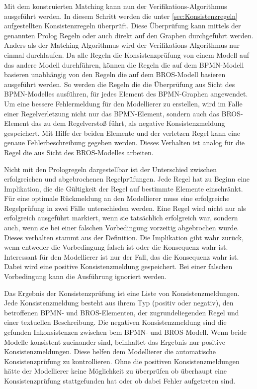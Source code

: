 Mit dem konstruierten Matching kann nun der Verifikations-Algorithmus ausgeführt werden.
In diesem Schritt werden die unter \cref{sec:Konsistenzregeln} aufgestellten Konsistenzregeln überprüft.
Diese Überprüfung kann mittels der genannten Prolog Regeln oder auch direkt auf den Graphen durchgeführt werden.
Anders als der Matching-Algorithmus wird der Verifikations-Algorithmus nur einmal durchlaufen.
Da alle Regeln die Konsistenzprüfung von einem Modell auf das andere Modell durchführen, können die Regeln die auf dem BPMN-Modell basieren unabhängig von den Regeln die auf dem BROS-Modell basieren ausgeführt werden.
So werden die Regeln die die Überprüfung aus Sicht des BPMN-Modelles ausführen, für jedes Element des BPMN-Graphen angewendet.
Um eine bessere Fehlermeldung für den Modellierer zu erstellen, wird im Falle einer Regelverletzung nicht nur das BPMN-Element, sondern auch das BROS-Element das zu dem Regelverstoß führt, als negative Konsistenzmeldung gespeichert.
Mit Hilfe der beiden Elemente und der verletzen Regel kann eine genaue Fehlerbeschreibung gegeben werden.
Dieses Verhalten ist analog für die Regel die aus Sicht des BROS-Modelles arbeiten.

Nicht mit den Prologregeln dargestellbar ist der Unterschied zwischen erfolgreichen und abgebrochenen Regelprüfungen.
Jede Regel hat zu Beginn eine Implikation, die die Gültigkeit der Regel auf bestimmte Elemente einschränkt.
Für eine optimale Rückmeldung an den Modellierer muss eine erfolgreiche Regelprüfung in zwei Fälle unterschieden werden.
Eine Regel wird nicht nur als erfolgreich ausgeführt markiert, wenn sie tatsächlich erfolgreich war, sondern auch, wenn sie bei einer falschen Vorbedingung vorzeitig abgebrochen wurde.
Dieses verhalten stammt aus der Definition.
Die Implikation gibt wahr zurück, wenn entweder die Vorbedingung falsch ist oder die Konsequenz wahr ist.
Interessant für den Modellierer ist nur der Fall, das die Konsequenz wahr ist.
Dabei wird eine positive Konsistenzmeldung gespeichert.
Bei einer falschen Vorbedingung kann die Ausführung ignoriert werden.

Das Ergebnis der Konsistenzprüfung ist eine Liste von Konsistenzmeldungen.
Jede Konsistenzmeldung besteht aus ihrem Typ (positiv oder negativ), den betroffenen BPMN- und BROS-Elementen, der zugrundeliegenden Regel und einer textuellen Beschreibung.
Die negativen Konsistenzmeldung sind die gefunden Inkonsistenzen zwischen bem BPMN- und BROS-Modell.
Wenn beide Modelle konsistent zueinander sind, beinhaltet das Ergebnis nur positive Konsistenzmeldungen.
Diese helfen dem Modellierer die automatische Konsistenzprüfung zu kontrollieren.
Ohne die positiven Konsistenzmeldungen hätte der Modellierer keine Möglichkeit zu überprüfen ob überhaupt eine Konsistenzprüfung stattgefunden hat oder ob dabei Fehler aufgetreten sind.

